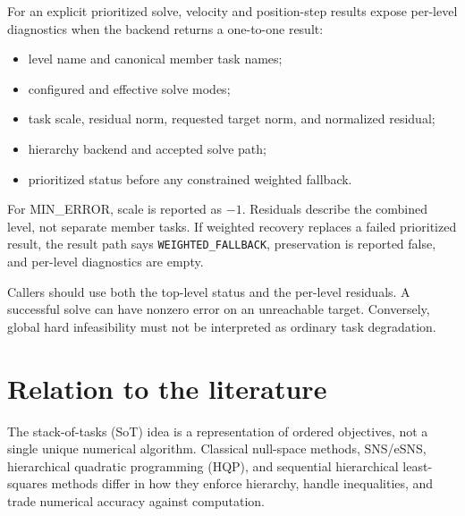 \documentclass[11pt]{article}
\begin{document}
For an explicit prioritized solve, velocity and position-step results expose
per-level diagnostics when the backend returns a one-to-one result:
\begin{itemize}[nosep]
  \item level name and canonical member task names;
  \item configured and effective solve modes;
  \item task scale, residual norm, requested target norm, and normalized
        residual;
  \item hierarchy backend and accepted solve path;
  \item prioritized status before any constrained weighted fallback.
\end{itemize}
For MIN\_ERROR, scale is reported as $-1$. Residuals describe the combined
level, not separate member tasks. If weighted recovery replaces a failed
prioritized result, the result path says \texttt{WEIGHTED\_FALLBACK},
preservation is reported false, and per-level diagnostics are empty.

Callers should use both the top-level status and the per-level residuals. A
successful solve can have nonzero error on an unreachable target. Conversely,
global hard infeasibility must not be interpreted as ordinary task degradation.

\section{Relation to the literature}

The stack-of-tasks (SoT) idea is a representation of ordered objectives, not a
single unique numerical algorithm. Classical null-space methods, SNS/eSNS,
hierarchical quadratic programming (HQP), and sequential hierarchical
least-squares methods differ in how they enforce hierarchy, handle
inequalities, and trade numerical accuracy against computation.
\end{document}
